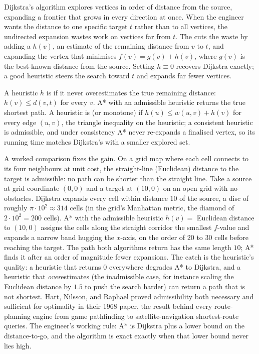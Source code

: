 Dijkstra's algorithm explores vertices in order of distance from the
source, expanding a frontier that grows in every direction at once.
When the engineer wants the distance to one specific target $t$
rather than to all vertices, the undirected expansion wastes work on
vertices far from $t$. The  cuts the waste by
adding a  $h(v)$, an estimate of the remaining
distance from $v$ to $t$, and expanding the vertex that minimises
$f(v) = g(v) + h(v)$, where $g(v)$ is the best-known distance from
the source. Setting $h \equiv 0$ recovers Dijkstra exactly; a good
heuristic steers the search toward $t$ and expands far fewer
vertices.

\begin{principle}
A heuristic $h$ is  if it never overestimates the
true remaining distance: $h(v) \leq d(v, t)$ for every $v$. A* with
an admissible heuristic returns the true shortest path. A heuristic
is  (or monotone) if $h(u) \leq w(u, v) + h(v)$
for every edge $(u, v)$, the triangle inequality on the heuristic;
a consistent heuristic is admissible, and under consistency A* never
re-expands a finalised vertex, so its running time matches
Dijkstra's with a smaller explored set.
\end{principle}

A worked comparison fixes the gain. On a grid map where each cell
connects to its four neighbours at unit cost, the straight-line
(Euclidean) distance to the target is admissible: no path can be
shorter than the straight line. Take a source at grid coordinate
$(0, 0)$ and a target at $(10, 0)$ on an open grid with no
obstacles. Dijkstra expands every cell within distance $10$ of the
source, a disc of roughly $\pi \cdot 10^{2} \approx 314$ cells
(in the grid's Manhattan metric, the diamond of $2 \cdot 10^{2} =
200$ cells). A* with the admissible heuristic $h(v) = $ Euclidean
distance to $(10, 0)$ assigns the cells along the straight corridor
the smallest $f$-value and expands a narrow band hugging the
$x$-axis, on the order of $20$ to $30$ cells before reaching the
target. The path both algorithms return has the same length $10$;
A* finds it after an order of magnitude fewer expansions. The catch
is the heuristic's quality: a heuristic that returns $0$ everywhere
degrades A* to Dijkstra, and a heuristic that \emph{over}estimates
(the inadmissible case, for instance scaling the Euclidean distance
by $1.5$ to push the search harder) can return a path that is not
shortest. Hart, Nilsson, and Raphael proved admissibility both
necessary and sufficient for optimality in their 1968 paper, the
result behind every route-planning engine from game pathfinding to
satellite-navigation shortest-route queries. The engineer's working rule: A* is Dijkstra
plus a lower bound on the distance-to-go, and the algorithm is exact
exactly when that lower bound never lies high.

